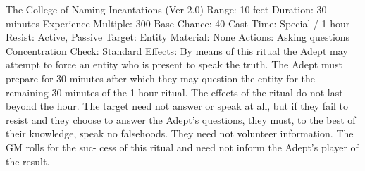 \begin{Chapter}{The College of Naming Incantations (Ver 2.0)}
Range: 10 feet 
Duration: 30 minutes 
Experience Multiple: 300 
Base Chance: 40%
Cast Time: Special / 1 hour 
Resist: Active, Passive 
Target: Entity 
Material: None 
Actions: Asking questions 
Concentration Check: Standard 
Effects:  By  means  of  this  ritual  the  Adept  may 
attempt  to  force  an  entity  who  is  present  to  speak 
the  truth.  The  Adept  must  prepare  for  30  minutes 
after  which  they  may  question  the  entity  for  the 
remaining  30  minutes  of  the  1  hour  ritual.  The 
effects  of  the  ritual  do  not  last  beyond  the  hour. 
The  target  need  not  answer  or  speak  at  all,  but  if 
they  fail  to  resist  and  they  choose  to  answer  the 
Adept’s  questions,  they  must,  to  the  best  of  their 
knowledge,  speak  no  falsehoods.  They  need  not 
volunteer  information.  The  GM  rolls  for  the  suc-
cess of this ritual and need not inform the Adept’s 
player of the result. 

\end{Chapter}
